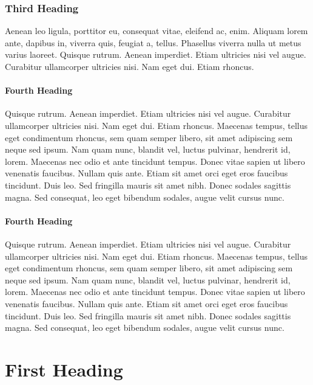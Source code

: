 \documentclass[11pt,a4paper]{scrreprt}
\begin{document}
\subsection{Third Heading}

Aenean leo ligula, porttitor eu, consequat vitae, eleifend ac, enim. Aliquam lorem ante, dapibus in, viverra quis, feugiat a, tellus. Phasellus viverra nulla ut metus varius laoreet. Quisque rutrum. Aenean imperdiet. Etiam ultricies nisi vel augue. Curabitur ullamcorper ultricies nisi. Nam eget dui. Etiam rhoncus.

\subsubsection{Fourth Heading}

Quisque rutrum. Aenean imperdiet. Etiam ultricies nisi vel augue. Curabitur ullamcorper ultricies nisi. Nam eget dui. Etiam rhoncus. Maecenas tempus, tellus eget condimentum rhoncus, sem quam semper libero, sit amet adipiscing sem neque sed ipsum. Nam quam nunc, blandit vel, luctus pulvinar, hendrerit id, lorem. Maecenas nec odio et ante tincidunt tempus. Donec vitae sapien ut libero venenatis faucibus. Nullam quis ante. Etiam sit amet orci eget eros faucibus tincidunt. Duis leo. Sed fringilla mauris sit amet nibh. Donec sodales sagittis magna. Sed consequat, leo eget bibendum sodales, augue velit cursus nunc.

\subsubsection{Fourth Heading}

Quisque rutrum. Aenean imperdiet. Etiam ultricies nisi vel augue. Curabitur ullamcorper ultricies nisi. Nam eget dui. Etiam rhoncus. Maecenas tempus, tellus eget condimentum rhoncus, sem quam semper libero, sit amet adipiscing sem neque sed ipsum. Nam quam nunc, blandit vel, luctus pulvinar, hendrerit id, lorem. Maecenas nec odio et ante tincidunt tempus. Donec vitae sapien ut libero venenatis faucibus. Nullam quis ante. Etiam sit amet orci eget eros faucibus tincidunt. Duis leo. Sed fringilla mauris sit amet nibh. Donec sodales sagittis magna. Sed consequat, leo eget bibendum sodales, augue velit cursus nunc.

\chapter{First Heading} \label{chap:first-heading}
\end{document}
